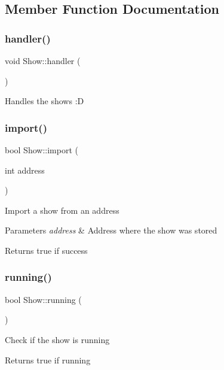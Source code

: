 \subsection{Member Function Documentation}
\mbox{\label{class_show_a659057610d0df455128bfae9d27e7fc8}} 
\subsubsection{\texorpdfstring{handler()}{handler()}}
{\footnotesize\ttfamily void Show\+::handler (\begin{DoxyParamCaption}{ }\end{DoxyParamCaption})}

Handles the shows \+:D \mbox{\label{class_show_a5b0ec76ffad16e42d14d9738a64d7181}} 
\subsubsection{\texorpdfstring{import()}{import()}}
{\footnotesize\ttfamily bool Show\+::import (\begin{DoxyParamCaption}\item[{int}]{address }\end{DoxyParamCaption})}

Import a show from an address 
\begin{DoxyParams}{Parameters}
{\em address} & Address where the show was stored \\
\hline
\end{DoxyParams}
\begin{DoxyReturn}{Returns}
true if success 
\end{DoxyReturn}
\mbox{\label{class_show_a7e550a1e7b0a11b290296adb4490e294}} 
\subsubsection{\texorpdfstring{running()}{running()}}
{\footnotesize\ttfamily bool Show\+::running (\begin{DoxyParamCaption}{ }\end{DoxyParamCaption})}

Check if the show is running \begin{DoxyReturn}{Returns}
true if running 
\end{DoxyReturn}
\mbox{\label{class_show_a8369b14a9b23c90f2c903aa0934da713}} 
